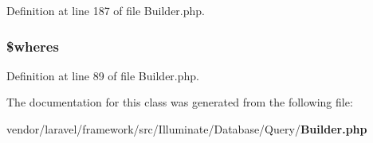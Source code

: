 Definition at line 187 of file Builder.\+php.

\subsubsection[{\$wheres}]{\setlength{\rightskip}{0pt plus 5cm}\$wheres}\label{class_illuminate_1_1_database_1_1_query_1_1_builder_ac95d1c24a529a97f334c1e55887099e2}


Definition at line 89 of file Builder.\+php.



The documentation for this class was generated from the following file\+:\begin{DoxyCompactItemize}
\item 
vendor/laravel/framework/src/\+Illuminate/\+Database/\+Query/{\bf Builder.\+php}\end{DoxyCompactItemize}
